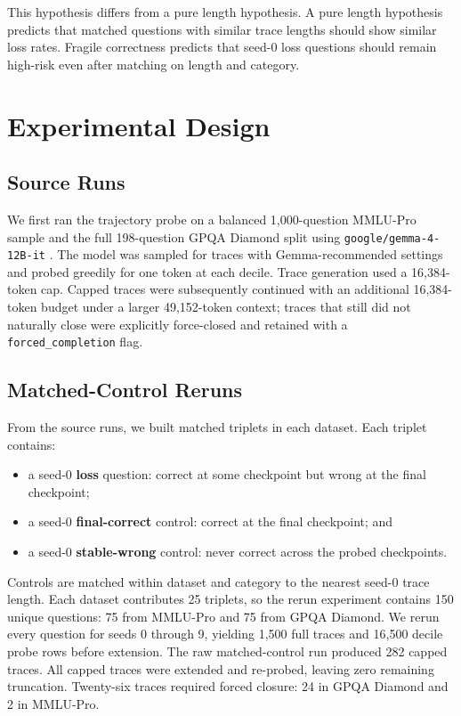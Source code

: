 \documentclass[11pt]{article}
\begin{document}
This hypothesis differs from a pure length hypothesis. A pure length
hypothesis predicts that matched questions with similar trace lengths should
show similar loss rates. Fragile correctness predicts that seed-0 loss
questions should remain high-risk even after matching on length and category.

\section{Experimental Design}

\subsection{Source Runs}

We first ran the trajectory probe on a balanced 1,000-question MMLU-Pro sample
and the full 198-question GPQA Diamond split using
\texttt{google/gemma-4-12B-it} \citep{gemma4model}. The model was sampled for
traces with Gemma-recommended settings and probed greedily for one token at
each decile.
Trace generation used a 16,384-token cap. Capped traces were subsequently
continued with an additional 16,384-token budget under a larger 49,152-token
context; traces that still did not naturally close were explicitly
force-closed and retained with a \texttt{forced\_completion} flag.

\subsection{Matched-Control Reruns}

From the source runs, we built matched triplets in each dataset. Each triplet
contains:

\begin{itemize}[leftmargin=*]
  \item a seed-0 \textbf{loss} question: correct at some checkpoint but wrong
  at the final checkpoint;
  \item a seed-0 \textbf{final-correct} control: correct at the final
  checkpoint; and
  \item a seed-0 \textbf{stable-wrong} control: never correct across the
  probed checkpoints.
\end{itemize}

Controls are matched within dataset and category to the nearest seed-0 trace
length. Each dataset contributes 25 triplets, so the rerun experiment contains
150 unique questions: 75 from MMLU-Pro and 75 from GPQA Diamond. We rerun
every question for seeds 0 through 9, yielding 1,500 full traces and 16,500
decile probe rows before extension. The raw matched-control run produced 282
capped traces. All capped traces were extended and re-probed, leaving zero
remaining truncation. Twenty-six traces required forced closure: 24 in GPQA
Diamond and 2 in MMLU-Pro.
\end{document}
